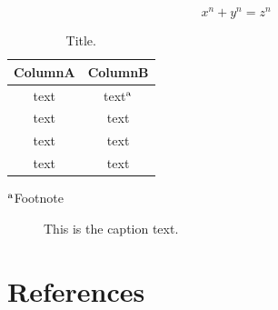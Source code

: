 \documentclass[12pt]{article}
\begin{document}
\begin{equation}
{x}^{n} + {y}^{n} = {z}^{n}
\end{equation}
\begin{table}[H]
	\centering
	\caption{Title.}
	\small
	\begin{tabular}{cc}
		\hline
		ColumnA & ColumnB \\ \hline
		text & text{\scriptsize $^{\rm a}$} \\
		text & text \\
		text & text \\
		text & text \\
		\hline
	\end{tabular}
	
	{\footnotesize 	{\scriptsize $^{\rm a}$}Footnote}
\end{table}
\begin{figure}[h] 
	\caption{This is the caption text.}
	\label{fig:Chrysanthemum}
\end{figure}

\section*{References}

%
\end{document}
